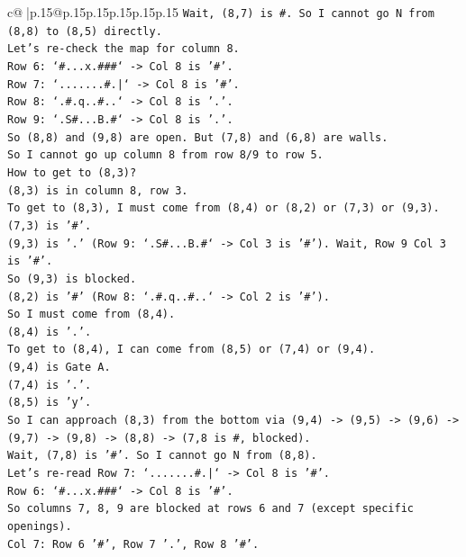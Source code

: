 \documentclass{article}
\begin{document}
{\begin{supertabular}{c@{$\;$}|p{.15\linewidth}@{}p{.15\linewidth}p{.15\linewidth}p{.15\linewidth}p{.15\linewidth}p{.15\linewidth}}
{{{\texttt{Wait, (8,7) is \#. So I cannot go N from (8,8) to (8,5) directly.} \\
\texttt{Let's re{-}check the map for column 8.} \\
\texttt{Row 6: `\#...x.\#\#\#` {-}> Col 8 is '\#'.} \\
\texttt{Row 7: `.......\#.|` {-}> Col 8 is '\#'.} \\
\texttt{Row 8: `.\#.q..\#..` {-}> Col 8 is '.'.} \\
\texttt{Row 9: `.S\#...B.\#` {-}> Col 8 is '.'.} \\
\texttt{So (8,8) and (9,8) are open. But (7,8) and (6,8) are walls.} \\
\texttt{So I cannot go up column 8 from row 8/9 to row 5.} \\
\texttt{How to get to (8,3)?} \\
\texttt{(8,3) is in column 8, row 3.} \\
\texttt{To get to (8,3), I must come from (8,4) or (8,2) or (7,3) or (9,3).} \\
\texttt{(7,3) is '\#'.} \\
\texttt{(9,3) is '.' (Row 9: `.S\#...B.\#` {-}> Col 3 is '\#'). Wait, Row 9 Col 3 is '\#'.} \\
\texttt{So (9,3) is blocked.} \\
\texttt{(8,2) is '\#' (Row 8: `.\#.q..\#..` {-}> Col 2 is '\#').} \\
\texttt{So I must come from (8,4).} \\
\texttt{(8,4) is '.'.} \\
\texttt{To get to (8,4), I can come from (8,5) or (7,4) or (9,4).} \\
\texttt{(9,4) is Gate A.} \\
\texttt{(7,4) is '.'.} \\
\texttt{(8,5) is 'y'.} \\
\texttt{So I can approach (8,3) from the bottom via (9,4) {-}> (9,5) {-}> (9,6) {-}> (9,7) {-}> (9,8) {-}> (8,8) {-}> (7,8 is \#, blocked).} \\
\texttt{Wait, (7,8) is '\#'. So I cannot go N from (8,8).} \\
\texttt{Let's re{-}read Row 7: `.......\#.|` {-}> Col 8 is '\#'.} \\
\texttt{Row 6: `\#...x.\#\#\#` {-}> Col 8 is '\#'.} \\
\texttt{So columns 7, 8, 9 are blocked at rows 6 and 7 (except specific openings).} \\
\texttt{Col 7: Row 6 '\#', Row 7 '.', Row 8 '\#'.} \\
}}}
\end{supertabular}}
\end{document}
